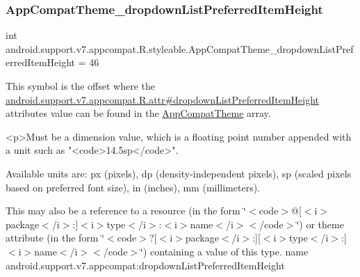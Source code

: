 \subsubsection{\texorpdfstring{App\+Compat\+Theme\+\_\+dropdown\+List\+Preferred\+Item\+Height}{AppCompatTheme\_dropdownListPreferredItemHeight}}
{\footnotesize\ttfamily int android.\+support.\+v7.\+appcompat.\+R.\+styleable.\+App\+Compat\+Theme\+\_\+dropdown\+List\+Preferred\+Item\+Height = 46\hspace{0.3cm}{\ttfamily [static]}}

This symbol is the offset where the \hyperlink{classandroid_1_1support_1_1v7_1_1appcompat_1_1R_1_1attr_a29d0c6e43e9ec5af313b68651d53f4ec}{android.\+support.\+v7.\+appcompat.\+R.\+attr\#dropdown\+List\+Preferred\+Item\+Height} attribute\textquotesingle{}s value can be found in the \hyperlink{classandroid_1_1support_1_1v7_1_1appcompat_1_1R_1_1styleable_a5c42f89e8a410c323be34208d75c430b}{App\+Compat\+Theme} array.

\begin{DoxyVerb}      <p>Must be a dimension value, which is a floating point number appended with a unit such as "<code>14.5sp</code>".
\end{DoxyVerb}
 Available units are\+: px (pixels), dp (density-\/independent pixels), sp (scaled pixels based on preferred font size), in (inches), mm (millimeters). 

This may also be a reference to a resource (in the form \char`\"{}$<$code$>$@\mbox{[}$<$i$>$package$<$/i$>$\+:\mbox{]}$<$i$>$type$<$/i$>$\+:$<$i$>$name$<$/i$>$$<$/code$>$\char`\"{}) or theme attribute (in the form \char`\"{}$<$code$>$?\mbox{[}$<$i$>$package$<$/i$>$\+:\mbox{]}\mbox{[}$<$i$>$type$<$/i$>$\+:\mbox{]}$<$i$>$name$<$/i$>$$<$/code$>$\char`\"{}) containing a value of this type.  name android.\+support.\+v7.\+appcompat\+:dropdown\+List\+Preferred\+Item\+Height \mbox{\label{classandroid_1_1support_1_1v7_1_1appcompat_1_1R_1_1styleable_a3da6d88b52409300bd0e52cd51d23b95}} 
